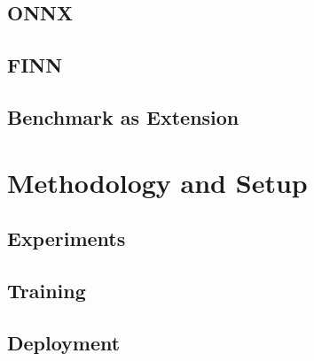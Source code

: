 \subsection{ONNX}


\subsection{FINN}


\subsection{Benchmark as Extension}


\section{Methodology and Setup}


\subsection{Experiments}


\subsection{Training}


\subsection{Deployment}
